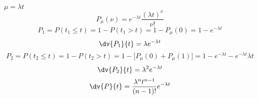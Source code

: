 \begin{esempio}
   $\mu=\lambda t$
   \begin{equation*}
      P_{\mu}(\nu)
      =e^{-\lambda t} \frac{(\lambda t)^{\nu}}{\nu!}
   \end{equation*}
   \begin{equation*}
      P_1
      =P(t_1 \leq t)
      =1 - P(t_1 > t)
      =1 - P_{\mu}(0)
      =1 - e^{-\lambda t}
   \end{equation*}
   \begin{equation*}
      \dv{P_1}{t}=\lambda e^{-\lambda t}
   \end{equation*}
   \begin{equation*}
      P_2
      =P(t_2 \leq t)
      =1 - P(t_2 > t)
      =1 - \bigl[ P_{\mu}(0) + P_{\mu}(1) \bigr]
      =1 - e^{-\lambda t} - e^{-\lambda t}\lambda t
   \end{equation*}
   \begin{equation*}
      \dv{P_2}{t}=\lambda^2 e^{-\lambda t}
   \end{equation*}
   \begin{equation*}
      \dv{P}{t}=\frac{\lambda^n t^{n - 1}}{(n - 1)!} e^{-\lambda t}
   \end{equation*}
\end{esempio}